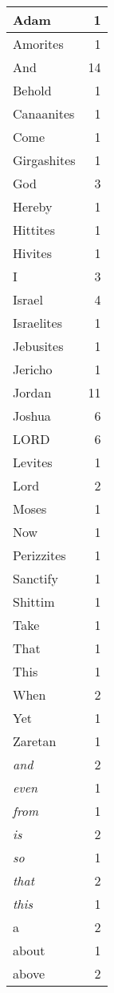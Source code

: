 \begin{center}
\begin{longtable}{l|r}
\hline \hline
\endlastfoot
Adam & 1 \\ \hline
Amorites & 1 \\ \hline
And & 14 \\ \hline
Behold & 1 \\ \hline
Canaanites & 1 \\ \hline
Come & 1 \\ \hline
Girgashites & 1 \\ \hline
God & 3 \\ \hline
Hereby & 1 \\ \hline
Hittites & 1 \\ \hline
Hivites & 1 \\ \hline
I & 3 \\ \hline
Israel & 4 \\ \hline
Israelites & 1 \\ \hline
Jebusites & 1 \\ \hline
Jericho & 1 \\ \hline
Jordan & 11 \\ \hline
Joshua & 6 \\ \hline
LORD & 6 \\ \hline
Levites & 1 \\ \hline
Lord & 2 \\ \hline
Moses & 1 \\ \hline
Now & 1 \\ \hline
Perizzites & 1 \\ \hline
Sanctify & 1 \\ \hline
Shittim & 1 \\ \hline
Take & 1 \\ \hline
That & 1 \\ \hline
This & 1 \\ \hline
When & 2 \\ \hline
Yet & 1 \\ \hline
Zaretan & 1 \\ \hline
\emph{and} & 2 \\ \hline
\emph{even} & 1 \\ \hline
\emph{from} & 1 \\ \hline
\emph{is} & 2 \\ \hline
\emph{so} & 1 \\ \hline
\emph{that} & 2 \\ \hline
\emph{this} & 1 \\ \hline
a & 2 \\ \hline
about & 1 \\ \hline
above & 2 \\ \hline

\end{longtable}
\end{center}
